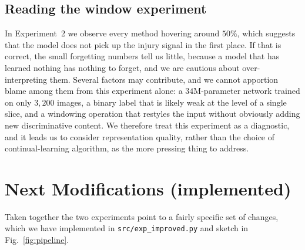 \documentclass[11pt]{article}
\begin{document}
\subsection{Reading the window experiment}
In Experiment~2 we observe every method hovering around $50\%$, which suggests
that the model does not pick up the injury signal in the first place. If that is
correct, the small forgetting numbers tell us little, because a model that has
learned nothing has nothing to forget, and we are cautious about over-interpreting
them. Several factors may contribute, and we cannot apportion blame among them
from this experiment alone: a $34$M-parameter network trained on only $3{,}200$
images, a binary label that is likely weak at the level of a single slice, and a
windowing operation that restyles the input without obviously adding new
discriminative content. We therefore treat this experiment as a diagnostic, and
it leads us to consider representation quality, rather than the choice of
continual-learning algorithm, as the more pressing thing to address.

\section{Next Modifications (implemented)}\label{sec:mods}
Taken together the two experiments point to a fairly specific set of changes,
which we have implemented in \texttt{src/exp\_improved.py} and sketch in
Fig.~\ref{fig:pipeline}.
\end{document}
